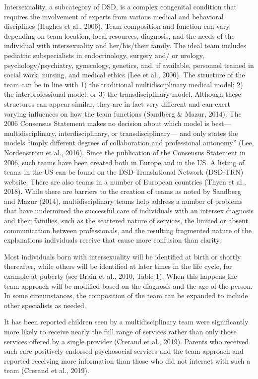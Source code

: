 \documentclass[
]{book}
\begin{document}
Intersexuality, a subcategory of DSD, is a complex congenital condition that requires the
involvement of experts from various medical and
behavioral disciplines (Hughes et al., 2006). Team
composition and function can vary depending on
team location, local resources, diagnosis, and the
needs of the individual with intersexuality and
her/his/their family. The ideal team includes pediatric subspecialists in endocrinology, surgery and/
or urology, psychology/psychiatry, gynecology,
genetics, and, if available, personnel trained in
social work, nursing, and medical ethics (Lee
et al., 2006). The structure of the team can be
in line with 1) the traditional multidisciplinary
medical model; 2) the interprofessional model;
or 3) the transdisciplinary model. Although these
structures can appear similar, they are in fact
very different and can exert varying influences
on how the team functions (Sandberg \& Mazur,
2014). The 2006 Consensus Statement makes no
decision about which model is best---multidisciplinary, interdisciplinary, or transdisciplinary---
and only states the models ``imply different
degrees of collaboration and professional
autonomy'' (Lee, Nordenström et al., 2016). Since
the publication of the Consensus Statement in
2006, such teams have been created both in
Europe and in the US. A listing of teams in the
US can be found on the DSD-Translational
Network (DSD-TRN) website. There are also
teams in a number of European countries (Thyen
et al., 2018). While there are barriers to the creation of teams as noted by Sandberg and Mazur
(2014), multidisciplinary teams help address a
number of problems that have undermined the
successful care of individuals with an intersex
diagnosis and their families, such as the scattered
nature of services, the limited or absent communication between professionals, and the resulting
fragmented nature of the explanations individuals
receive that cause more confusion than clarity.

Most individuals born with intersexuality will
be identified at birth or shortly thereafter, while
others will be identified at later times in the life
cycle, for example at puberty (see Brain et al.,
2010, Table 1). When this happens the team
approach will be modified based on the diagnosis
and the age of the person. In some circumstances,
the composition of the team can be expanded to
include other specialists as needed.

It has been reported children seen by a multidisciplinary team were significantly more likely
to receive nearly the full range of services rather
than only those services offered by a single provider (Crerand et al., 2019). Parents who received
such care positively endorsed psychosocial services and the team approach and reported receiving more information than those who did not
interact with such a team (Crerand et al., 2019).
\end{document}
